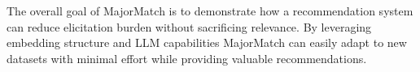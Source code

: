 The overall goal of MajorMatch is to demonstrate how a recommendation system can reduce elicitation burden without sacrificing relevance. By leveraging embedding structure and LLM capabilities MajorMatch can easily adapt to new datasets with minimal effort while providing valuable recommendations.

\newpage
